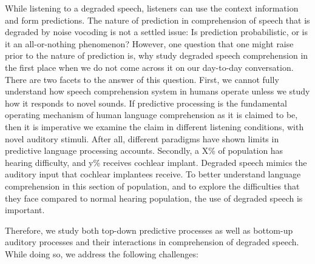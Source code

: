 \documentclass[a4paper, nobind]{templates/ociamthesis}
\begin{document}
While listening to a degraded speech, listeners can use the context information and form predictions.
The nature of prediction in comprehension of speech that is degraded by noise vocoding is not a settled issue:
Is prediction probabilistic, or is it an all-or-nothing phenomenon?
However, one question that one might raise prior to the nature of prediction is, why study degraded speech comprehension in the first place when we do not come across it on our day-to-day conversation.
There are two facets to the answer of this question.
First, we cannot fully understand how speech comprehension system in humans operate unless we study how it responds to novel sounds.
If predictive processing is the fundamental operating mechanism of human language comprehension as it is claimed to be, then it is imperative we examine the claim in different listening conditions, with novel auditory stimuli.
After all, different paradigms have shown limits in predictive language processing accounts.
Secondly, a X\% of population has hearing difficulty, and y\% receives cochlear implant.
Degraded speech mimics the auditory input that cochlear implantees receive.
To better understand language comprehension in this section of population, and to explore the difficulties that they face compared to normal hearing population, the use of degraded speech is important.

Therefore, we study both top-down predictive processes as well as bottom-up auditory processes and their interactions in comprehension of degraded speech.
While doing so, we address the following challenges:
\end{document}
